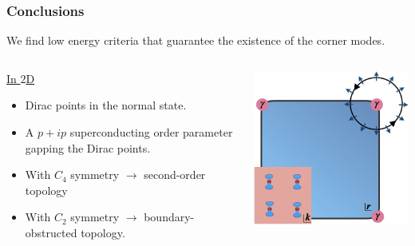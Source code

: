\documentclass{beamer}
\renewcommand{\(}{\left(}
\renewcommand{\)}{\right)}
\renewcommand{\[}{\left[}
\renewcommand{\]}{\right]}
\begin{document}
\begin{frame}
    \frametitle{Conclusions}

    We find low energy criteria that guarantee the existence of the corner modes.
    \vspace{10pt}
    \begin{columns}
        \begin{column}{0.5\textwidth}
            \underline{In $2$D}
            \begin{itemize}
                \item Dirac points in the normal state.
                \item A $p+ip$ superconducting order parameter gapping the Dirac points.
                \item With $C_4$ symmetry $\rightarrow$ second-order topology 
                \item With $C_2$ symmetry $\rightarrow$ boundary-obstructed topology. 
            \end{itemize}
        \end{column}
        \begin{column}{0.5\textwidth}
            \centering 
            \includegraphics[scale = 0.5]{HOTSc3.png}
        \end{column}
    \end{columns}

\end{frame}
\end{document}
